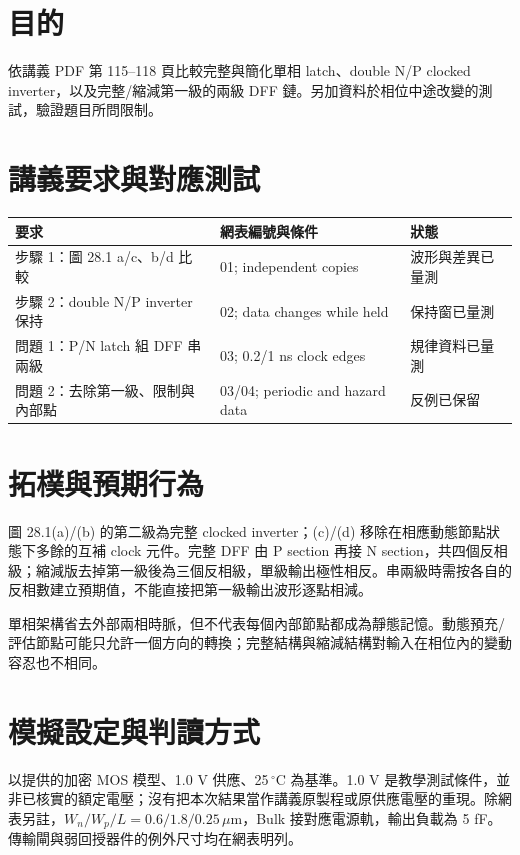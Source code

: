 \section{目的}

依講義 PDF 第 115--118 頁比較完整與簡化單相 latch、double N/P clocked inverter，以及完整/縮減第一級的兩級 DFF 鏈。另加資料於相位中途改變的測試，驗證題目所問限制。

\section{講義要求與對應測試}

\begin{center}
\small
\setlength{\tabcolsep}{4pt}
\begin{tabular}{p{.42\linewidth}p{.29\linewidth}p{.18\linewidth}}
\toprule
要求 & 網表編號與條件 & 狀態 \\
\midrule
步驟 1：圖 28.1 a/c、b/d 比較 & 01; independent copies & 波形與差異已量測 \\
步驟 2：double N/P inverter 保持 & 02; data changes while held & 保持窗已量測 \\
問題 1：P/N latch 組 DFF 串兩級 & 03; 0.2/1 ns clock edges & 規律資料已量測 \\
問題 2：去除第一級、限制與內部點 & 03/04; periodic and hazard data & 反例已保留 \\
\bottomrule
\end{tabular}
\end{center}

\section{拓樸與預期行為}

圖 28.1(a)/(b) 的第二級為完整 clocked inverter；(c)/(d) 移除在相應動態節點狀態下多餘的互補 clock 元件。完整 DFF 由 P section 再接 N section，共四個反相級；縮減版去掉第一級後為三個反相級，單級輸出極性相反。串兩級時需按各自的反相數建立預期值，不能直接把第一級輸出波形逐點相減。

單相架構省去外部兩相時脈，但不代表每個內部節點都成為靜態記憶。動態預充/評估節點可能只允許一個方向的轉換；完整結構與縮減結構對輸入在相位內的變動容忍也不相同。

\section{模擬設定與判讀方式}

以提供的加密 MOS 模型、1.0 V 供應、25\,$^\circ$C 為基準。1.0 V 是教學測試條件，並非已核實的額定電壓；沒有把本次結果當作講義原製程或原供應電壓的重現。除網表另註，$W_n/W_p/L=0.6/1.8/0.25\,\mu\mathrm m$，Bulk 接對應電源軌，輸出負載為 5 fF。傳輸閘與弱回授器件的例外尺寸均在網表明列。

